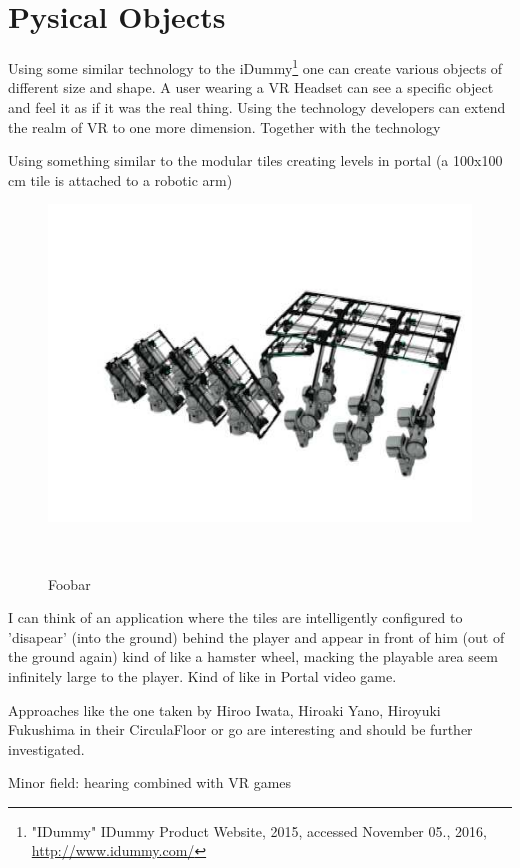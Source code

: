 \section{Pysical Objects}

Using some similar technology to the iDummy\footnote{"IDummy" IDummy Product Website, 2015, accessed November 05., 2016, \url{http://www.idummy.com/}} one can create various objects of different size and shape. A user wearing a VR Headset can see a specific object and feel it as if it was the real thing. Using the technology developers can extend the realm of VR to one more dimension. Together with the technology \cite{Azmandian:2016:HRD:2858036.2858226}

Using something similar to the modular tiles creating levels in portal (a 100x100 cm tile is attached to a robotic arm)

\begin{figure}
	\centering
	\includegraphics[width=0.9\columnwidth]{./figures/hqdefault}
	\caption{Foobar}~\label{fig:figure2}
\end{figure}

I can think of an application where the tiles are intelligently configured to 'disapear' (into the ground) behind the player and appear in front of him (out of the ground again) kind of like a hamster wheel, macking the playable area seem infinitely large to the player. Kind of like in Portal \cite{game:portal} video game.

Approaches like the one taken by Hiroo Iwata, Hiroaki Yano, Hiroyuki Fukushima in their CirculaFloor \cite{Iwata:2005:CLI:1078037.1079777} or \cite{Souman:2010:MVW:1670671.1670675} go are interesting and should be further investigated. 

Minor field: hearing combined with VR games

\textcolor{gray}{\blindtext[3]}
